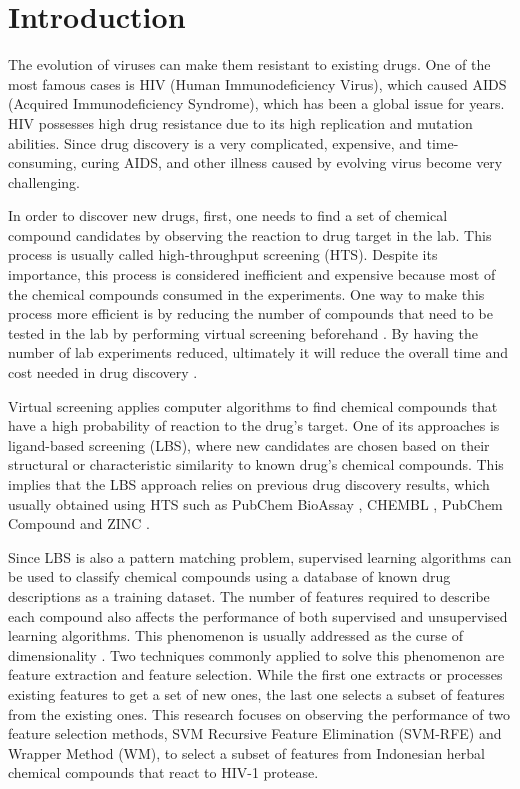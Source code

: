\documentclass[conference]{IEEEtran}
\begin{document}
\IEEEpeerreviewmaketitle

\section{Introduction}

The evolution of viruses can make them resistant to existing drugs. One of the most famous cases is HIV (Human Immunodeficiency Virus), which caused AIDS (Acquired Immunodeficiency Syndrome), which has been a global issue for years. HIV possesses high drug resistance due to its high replication and mutation abilities. Since drug discovery is a very complicated, expensive, and time-consuming, curing AIDS, and other illness caused by evolving virus become very challenging\cite{yanuar2014virtual}.

In order to discover new drugs, first, one needs to find a set of chemical compound candidates by observing the reaction to drug target in the lab. This process is usually called high-throughput screening (HTS). Despite its importance, this process is considered inefficient and expensive because most of the chemical compounds consumed in the experiments. One way to make this process more efficient is by reducing the number of compounds that need to be tested in the lab by performing virtual screening beforehand \cite{chen2017developing}. By having the number of lab experiments reduced, ultimately it will reduce the overall time and cost needed in drug discovery \cite{korkmaz2014drug}.

Virtual screening applies computer algorithms to find chemical compounds that have a high probability of reaction to the drug's target. One of its approaches is ligand-based screening (LBS), where new candidates are chosen based on their structural or characteristic similarity to known drug's chemical compounds. This implies that the LBS approach relies on previous drug discovery results, which usually obtained using HTS such as PubChem BioAssay \cite{bioassay2014update}, CHEMBL \cite{bento2014chembl}, PubChem Compound \cite{kim2015pubchem} and ZINC \cite{irwin2012zinc}.

Since LBS is also a pattern matching problem, supervised learning algorithms can be used to classify chemical compounds using a database of known drug descriptions as a training dataset. The number of features required to describe each compound also affects the performance of both supervised and unsupervised learning algorithms. This phenomenon is usually addressed as the curse of dimensionality \cite{janecek2008relationship}. Two techniques commonly applied to solve this phenomenon are feature extraction and feature selection. While the first one extracts or processes existing features to get a set of new ones, the last one selects a subset of features from the existing ones. This research focuses on observing the performance of two feature selection methods, SVM Recursive Feature Elimination (SVM-RFE) and Wrapper Method (WM), to select a subset of features from Indonesian herbal chemical compounds that react to HIV-1 protease.
\end{document}
